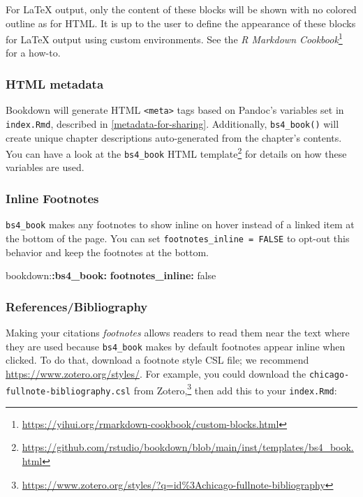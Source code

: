 \documentclass[
  12pt,
]{krantz}
\newenvironment{Shaded}{\begin{snugshade}}{\end{snugshade}}
\newcommand{\AttributeTok}[1]{\textcolor[rgb]{0.13,0.29,0.53}{#1}}
\newcommand{\CharTok}[1]{\textcolor[rgb]{0.31,0.60,0.02}{#1}}
\newcommand{\FunctionTok}[1]{\textcolor[rgb]{0.13,0.29,0.53}{\textbf{#1}}}
\newcommand{\KeywordTok}[1]{\textcolor[rgb]{0.13,0.29,0.53}{\textbf{#1}}}
\renewcommand{\href}[2]{#2\footnote{\url{#1}}}
\theoremstyle{definition}
\theoremstyle{definition}
\theoremstyle{definition}
\theoremstyle{definition}
\theoremstyle{remark}
\begin{document}
For LaTeX output, only the content of these blocks will be shown with no colored outline as for HTML. It is up to the user to define the appearance of these blocks for LaTeX output using custom environments. See the \href{https://yihui.org/rmarkdown-cookbook/custom-blocks.html}{\emph{R Markdown Cookbook}} for a how-to.

\subsubsection{HTML metadata}\label{html-metadata}

Bookdown will generate HTML \texttt{\textless{}meta\textgreater{}} tags based on Pandoc's variables set in \texttt{index.Rmd}, described in \ref{metadata-for-sharing}. Additionally, \texttt{bs4\_book()} will create unique chapter descriptions auto-generated from the chapter's contents. You can have a look at \href{https://github.com/rstudio/bookdown/blob/main/inst/templates/bs4_book.html}{the \texttt{bs4\_book} HTML
template} for details on how these variables are used.

\subsubsection{Inline Footnotes}\label{bs4-book-footnotes}

\texttt{bs4\_book} makes any footnotes to show inline on hover instead of a linked item at the bottom of the page. You can set \texttt{footnotes\_inline\ =\ FALSE} to opt-out this behavior and keep the footnotes at the bottom.

\begin{Shaded}
\begin{Highlighting}[]
\AttributeTok{bookdown:}\FunctionTok{:bs4\_book}\KeywordTok{:}
\AttributeTok{  }\FunctionTok{footnotes\_inline}\KeywordTok{:}\AttributeTok{ }\CharTok{false}
\end{Highlighting}
\end{Shaded}

\subsubsection{References/Bibliography}\label{referencesbibliography}

Making your citations \emph{footnotes} allows readers to read them near the text where they are used because \texttt{bs4\_book} makes by default footnotes appear inline when clicked.
To do that, download a footnote style CSL file; we recommend \url{https://www.zotero.org/styles/}.
For example, you could download the \texttt{chicago-fullnote-bibliography.csl} from \href{https://www.zotero.org/styles/?q=id\%3Achicago-fullnote-bibliography}{Zotero,} then
add this to your \texttt{index.Rmd}:
\end{document}
